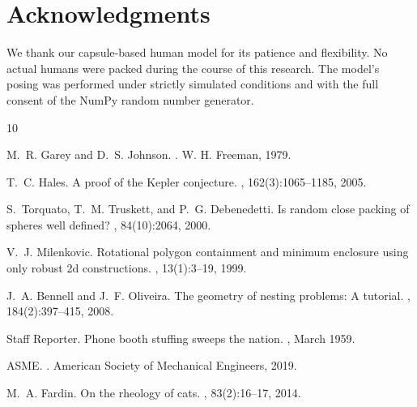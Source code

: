 \documentclass[11pt,letterpaper]{article}
\begin{document}
\section*{Acknowledgments}

We thank our capsule-based human model for its patience and flexibility. No actual humans were packed during the course of this research. The model's posing was performed under strictly simulated conditions and with the full consent of the NumPy random number generator.


\begin{thebibliography}{10}

M.~R. Garey and D.~S. Johnson.
.
\newblock W. H. Freeman, 1979.

T.~C. Hales.
\newblock A proof of the {K}epler conjecture.
, 162(3):1065--1185, 2005.

S.~Torquato, T.~M. Truskett, and P.~G. Debenedetti.
\newblock Is random close packing of spheres well defined?
, 84(10):2064, 2000.

V.~J. Milenkovic.
\newblock Rotational polygon containment and minimum enclosure using only robust 2d constructions.
, 13(1):3--19, 1999.

J.~A. Bennell and J.~F. Oliveira.
\newblock The geometry of nesting problems: A tutorial.
, 184(2):397--415, 2008.

{Staff Reporter}.
\newblock Phone booth stuffing sweeps the nation.
, March 1959.

{ASME}.
.
\newblock American Society of Mechanical Engineers, 2019.

M.~A. Fardin.
\newblock On the rheology of cats.
, 83(2):16--17, 2014.

\end{thebibliography}
\end{document}
